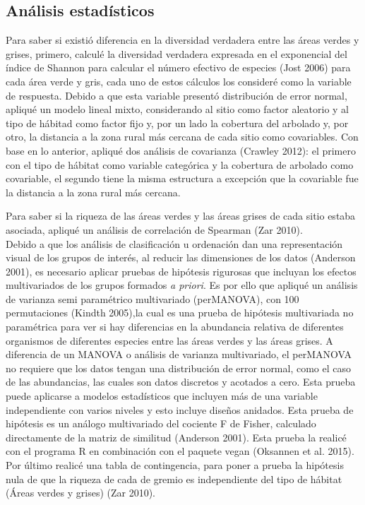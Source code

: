 \documentclass[letterpaper,12pt]{article}
\begin{document}
\subsection{Análisis estadísticos}
Para saber si existió diferencia en la  diversidad verdadera entre las áreas verdes y grises, primero, calculé la diversidad verdadera expresada en el exponencial del índice de Shannon para calcular el número efectivo de especies (Jost 2006) para cada área verde y gris, cada uno de estos cálculos los consideré como la variable de respuesta. Debido a que esta variable presentó distribución de error normal, apliqué un modelo lineal mixto, considerando al sitio como factor aleatorio y al tipo de hábitad como factor fijo y, por un lado la cobertura del arbolado y, por otro, la distancia a la zona rural más cercana de cada sitio como covariables. Con base en lo anterior, apliqué dos análisis de covarianza (Crawley 2012): el primero con el tipo de hábitat como variable categórica y la cobertura de arbolado como covariable, el segundo tiene la misma estructura a excepción que la covariable fue la distancia a la zona rural más cercana.

Para saber si la riqueza de las  áreas verdes y las áreas grises de cada sitio estaba asociada, apliqué un análisis de correlación de Spearman (Zar 2010).\\
Debido a que los análisis de clasificación u ordenación dan una representación visual de los grupos de interés, al reducir las dimensiones de los datos (Anderson 2001), es necesario aplicar pruebas de hipótesis rigurosas que incluyan los efectos multivariados de los grupos formados \textit{a priori}. Es por ello que apliqué un análisis de varianza semi paramétrico multivariado (perMANOVA), con 100 permutaciones (Kindth 2005),la cual es una prueba de hipótesis multivariada no paramétrica para ver si hay diferencias en la abundancia relativa de diferentes organismos de diferentes especies entre las áreas verdes y las áreas grises. A diferencia de un MANOVA o análisis de varianza multivariado, el perMANOVA no requiere que los datos tengan una distribución de error normal, como el caso de las abundancias, las cuales son datos discretos y acotados a cero. Esta prueba puede aplicarse a modelos estadísticos que incluyen más de una variable independiente con varios niveles y esto incluye diseños anidados. Esta prueba de hipótesis es un análogo multivariado del cociente F de Fisher, calculado directamente de la matriz de similitud (Anderson 2001). Esta prueba la realicé con el programa R en combinación con el paquete vegan (Oksannen et al. 2015).\\
Por último realicé una tabla de contingencia, para poner a prueba la hipótesis nula de que la riqueza de cada de gremio es independiente del tipo de hábitat (Áreas verdes y grises) (Zar 2010).
\end{document}
